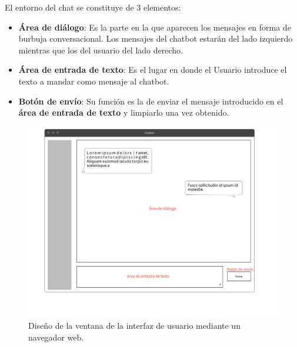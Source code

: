 El entorno del chat se constituye de 3 elementos:

\begin{itemize}
    \item \textbf{Área de diálogo}: Es la parte en la que aparecen los mensajes en forma de burbuja conversacional. Los mensajes del chatbot estarán del lado izquierdo mientras que los del usuario del lado derecho.
    \item \textbf{Área de entrada de texto}: Es el lugar en donde el Usuario introduce el texto a mandar como mensaje al chatbot.
    \item \textbf{Botón de envío}: Su función es la de enviar el mensaje introducido en el \textbf{área de entrada de texto} y limpiarlo una vez obtenido.
\end{itemize}

\begin{figure}[ht]
    \centering
    \includegraphics[scale=0.425]{images/5/interfaz-usuario}
    \caption{Diseño de la ventana de la interfaz de usuario mediante un navegador web.}
    \label{fig:interfaz-usuario}
\end{figure}
